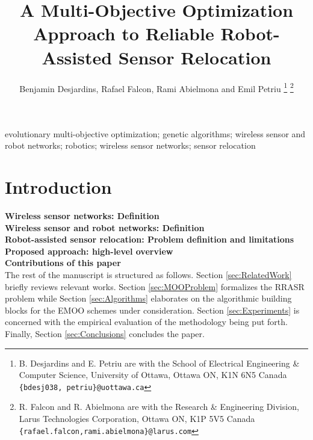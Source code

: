 \documentclass[conference]{IEEEtran}
\begin{document}
\title{A Multi-Objective Optimization Approach to Reliable Robot-Assisted Sensor Relocation}

\author{Benjamin Desjardins, Rafael Falcon, Rami Abielmona and Emil Petriu
\thanks{B. Desjardins and E. Petriu are with the School of Electrical Engineering \& Computer Science,
        University of Ottawa, Ottawa ON, K1N 6N5 Canada
        {\tt\small \{bdesj038, petriu\}@uottawa.ca}}%
\thanks{R. Falcon and R. Abielmona are with the Research \& Engineering Division,
        Larus Technologies Corporation, Ottawa ON, K1P 5V5 Canada
        {\tt\small \{rafael.falcon,rami.abielmona\}@larus.com}}%
			  }%

\vspace{-1cm}
\maketitle

\begin{abstract}

\end{abstract}

\vspace{0.25cm}

\noindent \begin{IEEEkeywords}
evolutionary multi-objective optimization; genetic algorithms; wireless sensor and robot networks; robotics; wireless sensor networks; sensor relocation
\end{IEEEkeywords}

\IEEEpeerreviewmaketitle

\section{Introduction}
\label{sec:Intro}

\textbf{Wireless sensor networks: Definition} \\

\textbf{Wireless sensor and robot networks: Definition} \\

\textbf{Robot-assisted sensor relocation: Problem definition and limitations} \\

\textbf{Proposed approach: high-level overview} \\

\textbf{Contributions of this paper} \\

The rest of the manuscript is structured as follows. Section \ref{sec:RelatedWork} briefly reviews relevant works. Section \ref{sec:MOOProblem} formalizes the RRASR problem while Section \ref{sec:Algorithms} elaborates on the algorithmic building blocks for the EMOO schemes under consideration. Section \ref{sec:Experiments} is concerned with the empirical evaluation of the methodology being put forth. Finally, Section \ref{sec:Conclusions} concludes the paper.
\end{document}
